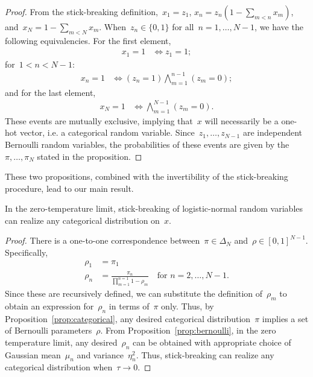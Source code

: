\documentclass[twoside]{article}
\begin{document}
\begin{proof}
  From the stick-breaking definition,~${x_1 = z_1}$,
  ${x_n = z_n (1- \sum_{m < n} x_m)}$,
  and~${x_N = 1-\sum_{m < N} x_m}$.
  When~${z_n \in \{0,1\}}$ for all~${n = 1, \ldots, N-1}$,
  we have the following equivalencies. For the first element,
  \begin{align*}
    x_1 = 1 &\iff z_1 = 1;
  \end{align*}
  for~${1 < n < N-1}:$
  \begin{align*}
    x_n = 1 &\iff (z_n = 1) \bigwedge_{m=1}^{n-1} (z_m = 0);
  \end{align*}
  and for the last element,
  \begin{align*}
    x_N = 1 &\iff \bigwedge_{m=1}^{N-1} (z_m = 0).
  \end{align*}
  These events are mutually exclusive, implying that~$x$ will
  necessarily be a one-hot vector, i.e. a categorical random variable.
  Since~$z_1, \ldots, z_{N-1}$ are independent Bernoulli random
  variables, the probabilities of these events are given
  by the~${\pi, \ldots, \pi_N}$ stated in the proposition. 
\end{proof}

These two propositions, combined with the invertibility of the
stick-breaking procedure, lead to our main result.

\begin{lemma}
  In the zero-temperature limit, stick-breaking of logistic-normal
  random variables can realize any categorical distribution on~$x$.
\end{lemma}

\begin{proof}
  There is a one-to-one correspondence between~${\pi \in \Delta_N}$
  and~${\rho \in [0,1]^{N-1}}$.  Specifically,
  \begin{align*}
    \rho_1 &= \pi_1 \\
    \rho_n &= \frac{\pi_n}{\prod_{m=1}^{n=1} 1-\rho_m}
             \quad \text{for } n = 2, \ldots, N-1.
  \end{align*}
  Since these are recursively defined, we can substitute the definition
  of~$\rho_m$ to obtain an expression for~$\rho_n$ in terms of~$\pi$ only.
  Thus, by Proposition~\ref{prop:categorical}, any desired categorical
  distribution~$\pi$ implies a set of Bernoulli parameters~$\rho$.
  From Proposition~\ref{prop:bernoulli}, in the zero temperature limit,
  any desired~$\rho_n$ can be obtained with appropriate choice of
  Gaussian mean~$\mu_n$ and variance~$\eta_n^2$. Thus, stick-breaking
  can realize any categorical distribution when~${\tau \to 0}$.
\end{proof}
\end{document}
